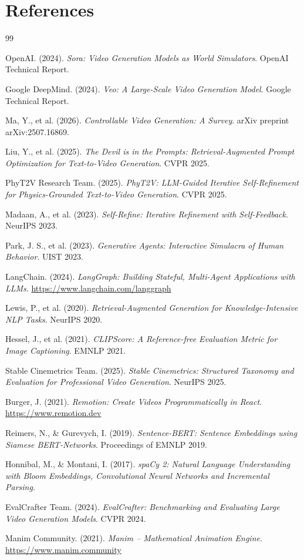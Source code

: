 \documentclass[11pt,a4paper]{article}
\begin{document}
\needspace{0.5\textheight}
\section{References}

\begin{thebibliography}{99}

 OpenAI. (2024). \textit{Sora: Video Generation Models as World Simulators}. OpenAI Technical Report.

 Google DeepMind. (2024). \textit{Veo: A Large-Scale Video Generation Model}. Google Technical Report.

 Ma, Y., et al. (2026). \textit{Controllable Video Generation: A Survey}. arXiv preprint arXiv:2507.16869.

 Liu, Y., et al. (2025). \textit{The Devil is in the Prompts: Retrieval-Augmented Prompt Optimization for Text-to-Video Generation}. CVPR 2025.

 PhyT2V Research Team. (2025). \textit{PhyT2V: LLM-Guided Iterative Self-Refinement for Physics-Grounded Text-to-Video Generation}. CVPR 2025.

 Madaan, A., et al. (2023). \textit{Self-Refine: Iterative Refinement with Self-Feedback}. NeurIPS 2023.

 Park, J. S., et al. (2023). \textit{Generative Agents: Interactive Simulacra of Human Behavior}. UIST 2023.

 LangChain. (2024). \textit{LangGraph: Building Stateful, Multi-Agent Applications with LLMs}. \url{https://www.langchain.com/langgraph}

 Lewis, P., et al. (2020). \textit{Retrieval-Augmented Generation for Knowledge-Intensive NLP Tasks}. NeurIPS 2020.

 Hessel, J., et al. (2021). \textit{CLIPScore: A Reference-free Evaluation Metric for Image Captioning}. EMNLP 2021.

 Stable Cinemetrics Team. (2025). \textit{Stable Cinemetrics: Structured Taxonomy and Evaluation for Professional Video Generation}. NeurIPS 2025.

 Burger, J. (2021). \textit{Remotion: Create Videos Programmatically in React}. \url{https://www.remotion.dev}

 Reimers, N., \& Gurevych, I. (2019). \textit{Sentence-BERT: Sentence Embeddings using Siamese BERT-Networks}. Proceedings of EMNLP 2019.

 Honnibal, M., \& Montani, I. (2017). \textit{spaCy 2: Natural Language Understanding with Bloom Embeddings, Convolutional Neural Networks and Incremental Parsing}.

 EvalCrafter Team. (2024). \textit{EvalCrafter: Benchmarking and Evaluating Large Video Generation Models}. CVPR 2024.

 Manim Community. (2021). \textit{Manim -- Mathematical Animation Engine}. \url{https://www.manim.community}

\end{thebibliography}
\end{document}
